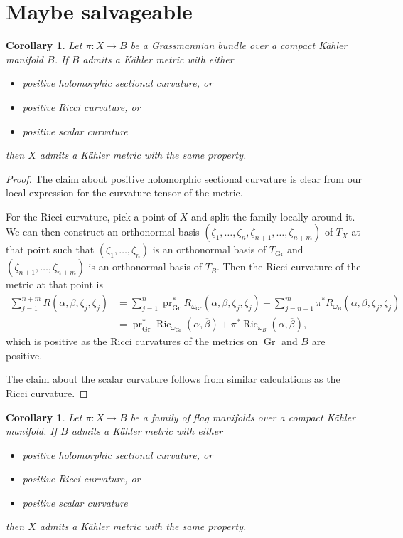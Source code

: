 \documentclass[10pt,a4paper]{article}
\newtheorem{coro}[theo]{Corollary}
\newtheorem*{proof}{Proof}
\def\ov#1{\overline{#1}}
\DeclareMathOperator{\Ric}{Ric}
\DeclareMathOperator{\pr}{pr}
\DeclareMathOperator{\Gr}{Gr}
\begin{document}
\section{Maybe salvageable}


\begin{coro}
\label{grassmannian-bundle-positive}
Let $\pi : X \to B$ be a Grassmannian bundle over a compact K\"ahler manifold
$B$.
If $B$ admits a K\"ahler metric with either
\begin{itemize}
    \item positive holomorphic sectional curvature, or
    \item positive Ricci curvature, or
    \item positive scalar curvature
\end{itemize}
then $X$ admits a K\"ahler metric with the same property.
\end{coro}

\begin{proof}
The claim about positive holomorphic sectional curvature is clear from our
local expression for the curvature tensor of the metric.

For the Ricci curvature, pick a point of $X$ and split the family locally around
it. We can then construct an orthonormal basis
$(\zeta_1,\ldots,\zeta_n,\zeta_{n+1},\ldots,\zeta_{n+m})$ of $T_{X}$ at that point such that
$(\zeta_1,\ldots,\zeta_n)$ is an orthonormal basis of $T_{\Gr}$ and
$(\zeta_{n+1},\ldots,\zeta_{n+m})$ is an orthonormal basis of $T_B$. Then the Ricci
curvature of the metric at that point is
\begin{align*}
\sum_{j=1}^{n+m} R(\alpha, \ov\beta, \zeta_j, \ov \zeta_j)
&= \sum_{j=1}^{n} \pr_{\Gr}^*R_{\omega_{\Gr}}(\alpha, \ov{\beta}, \zeta_j, \ov \zeta_j)
+ \sum_{j=n+1}^{m} \pi^* R_{\omega_{B}}(\alpha, \ov{\beta}, \zeta_j, \ov \zeta_j)
\\
&= \pr_{\Gr}^*\Ric_{\omega_{\Gr}}(\alpha, \ov\beta)
+ \pi^*\Ric_{\omega_B}(\alpha, \ov\beta),
\end{align*}
which is positive as the Ricci curvatures of the metrics on $\Gr$ and $B$ are
positive.

The claim about the scalar curvature follows from similar calculations as the
Ricci curvature.
\end{proof}


\begin{coro}
Let $\pi : X \to B$ be a family of flag manifolds over a compact K\"ahler
manifold.
If $B$ admits a K\"ahler metric with either
\begin{itemize}
    \item positive holomorphic sectional curvature, or
    \item positive Ricci curvature, or
    \item positive scalar curvature
\end{itemize}
then $X$ admits a K\"ahler metric with the same property.
\end{coro}
\end{document}
